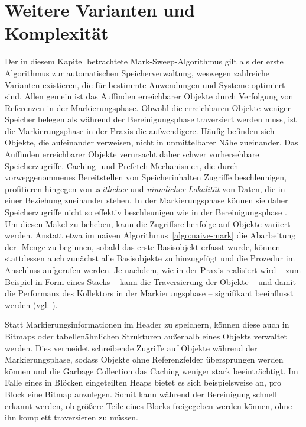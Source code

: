 

\section{Weitere Varianten und Komplexität}
\label{sec:mark-sweep-variations}
Der in diesem Kapitel betrachtete Mark-Sweep-Algorithmus gilt als der erste Algorithmus zur automatischen Speicherverwaltung, weswegen zahlreiche Varianten existieren, die für bestimmte Anwendungen und Systeme optimiert sind.
Allen gemein ist das Auffinden erreichbarer Objekte durch Verfolgung von Referenzen in der Markierungsphase.
Obwohl die erreichbaren Objekte weniger Speicher belegen als während der Bereinigungsphase traversiert werden muss, ist die Markierungsphase in der Praxis die aufwendigere.
Häufig befinden sich Objekte, die aufeinander verweisen, nicht in unmittelbarer Nähe zueinander.
Das Auffinden erreichbarer Objekte verursacht daher schwer vorhersehbare Speicherzugriffe.
Caching- und Prefetch-Mechanismen, die durch vorweggenommenes Bereitstellen von Speicherinhalten Zugriffe beschleunigen, profitieren hingegen von \textit{zeitlicher} und \textit{räumlicher Lokalität} von Daten, die in einer Beziehung zueinander stehen.
In der Markierungsphase können sie daher Speicherzugriffe nicht so effektiv beschleunigen wie in der Bereinigungsphase \cite[S. 21f]{handbook}.
Um diesen Makel zu beheben, kann die Zugriffsreihenfolge auf Objekte variiert werden.
Anstatt etwa im naiven Algorithmus~\ref{algo:naive-mark} die Abarbeitung der -Menge zu beginnen, sobald das erste Basisobjekt erfasst wurde, können stattdessen auch zunächst alle Basisobjekte zu  hinzugefügt und die Prozedur  im Anschluss aufgerufen werden.
Je nachdem, wie  in der Praxis realisiert wird -- zum Beispiel in Form eines Stacks -- kann die Traversierung der Objekte -- und damit die Performanz des Kollektors in der Markierungsphase -- signifikant beeinflusst werden (vgl. \cite[S. 19]{handbook}).

Statt Markierungsinformationen im Header zu speichern, können diese auch in Bitmaps oder tabellenähnlichen Strukturen außerhalb eines Objekts verwaltet werden.
Dies vermeidet schreibende Zugriffe auf Objekte während der Markierungsphase, sodass Objekte ohne Referenzfelder übersprungen werden können und die Garbage Collection das Caching weniger stark beeinträchtigt.
Im Falle eines in Blöcken eingeteilten Heaps bietet es sich beispielsweise an, pro Block eine Bitmap anzulegen.
Somit kann während der Bereinigung schnell erkannt werden, ob größere Teile eines Blocks freigegeben werden können, ohne ihn komplett traversieren zu müssen.

